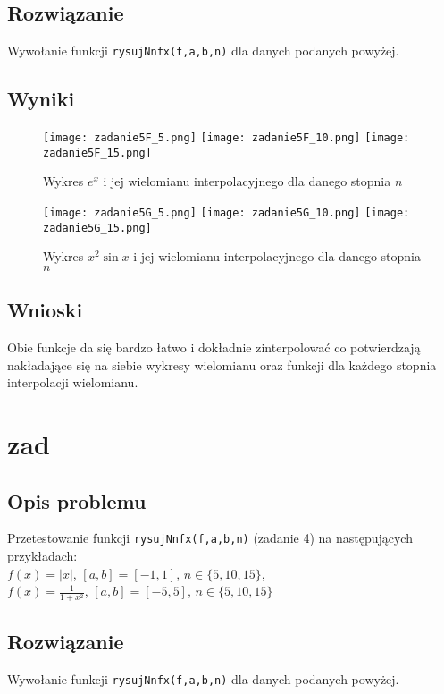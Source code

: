 \documentclass[10pt,a4paper, polish]{article}
\begin{document}
\subsection*{Rozwiązanie}
Wywołanie funkcji \texttt{rysujNnfx(f,a,b,n)} dla danych podanych powyżej.

\subsection*{Wyniki}
		\begin{figure}[h]
			\centering
			\texttt{[image: zadanie5F\_5.png]}
			\texttt{[image: zadanie5F\_10.png]}
			\texttt{[image: zadanie5F\_15.png]}
  			\caption{Wykres $e^{x}$ i jej wielomianu interpolacyjnego dla danego stopnia $n$}
  		\end{figure}		
		
		\begin{figure}[h]
			\centering
			\texttt{[image: zadanie5G\_5.png]}
			\texttt{[image: zadanie5G\_10.png]}
			\texttt{[image: zadanie5G\_15.png]}
  			\caption{Wykres $x^2\sin{x}$ i jej wielomianu interpolacyjnego dla danego stopnia $n$}
  		\end{figure}	
\subsection*{Wnioski}
Obie funkcje da się bardzo łatwo i dokładnie zinterpolować co potwierdzają nakładające się na siebie wykresy
wielomianu oraz funkcji dla każdego stopnia interpolacji wielomianu.

\section{zad}

\subsection*{Opis problemu}
Przetestowanie funkcji \texttt{rysujNnfx(f,a,b,n)} (zadanie 4) na następujących przykładach:\\
$f(x) = |x|$, $[a, b] = [-1,1]$, $n \in \{5,10,15\}$,\\
$f(x) = \frac{1}{1+x^2}$, $[a, b] = [-5,5]$, $n \in \{5,10,15\}$
\subsection*{Rozwiązanie}
Wywołanie funkcji \texttt{rysujNnfx(f,a,b,n)} dla danych podanych powyżej.
\end{document}
